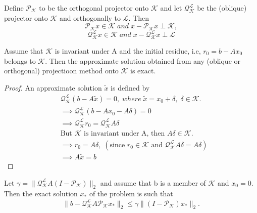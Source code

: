 \documentclass[10pt,a4paper]{article}
\begin{document}
Define $\mathcal{P}_{\mathcal{K}}$ to be the orthogonal projector onto $\mathcal{K}$ and let $\mathcal{Q}^\mathcal{L}_\mathcal{K}$ be the (oblique) projector onto $\mathcal{K}$ and orthogonally to $\mathcal{L}$. Then 
$$\mathcal{P}_{\mathcal{K}}x\in\mathcal{K}\;and\;x-\mathcal{P}_{\mathcal{K}}x\perp\mathcal{K},$$
$$\mathcal{Q}^\mathcal{L}_\mathcal{K}x\in\mathcal{K}\;and\;x-\mathcal{Q}^\mathcal{L}_\mathcal{K}x\perp\mathcal{L}$$

\begin{theorem}
Assume that $\mathcal{K}$ is invariant under A and the initial residue, i.e, $r_0=b-Ax_0$ belongs to $\mathcal{K}.$ Then the approximate solution obtained from any (oblique or orthogonal) projectioon method onto $\mathcal{K}$ is exact.
\end{theorem}

\begin{proof}
An approximate solution $\tilde{x}$ is defined by 
\begin{align*}
&\mathcal{Q}^\mathcal{L}_\mathcal{K}(b-A\tilde{x})=0,\;where\;\tilde{x}=x_0+\delta,\;\delta\in\mathcal{K}. \\
&\implies \mathcal{Q}^\mathcal{L}_\mathcal{K}(b-Ax_0-A\delta)=0 \\
&\implies \mathcal{Q}^\mathcal{L}_\mathcal{K}r_0=\mathcal{Q}^\mathcal{L}_\mathcal{K}A\delta \\
&\text{But }\mathcal{K}\text{ is invariant under A, then }A\delta\in\mathcal{K}. \\
&\implies r_0=A\delta,\;(\text{since }r_0\in\mathcal{K}\text{ and }\mathcal{Q}^\mathcal{L}_\mathcal{K}A\delta=A\delta) \\
&\implies A\tilde{x}=b
\end{align*}
\end{proof}

\begin{theorem}
Let $\gamma=\|\mathcal{Q}^\mathcal{L}_\mathcal{K}A(I-\mathcal{P}_\mathcal{K})\|_2$ and assume that b is a member of $\mathcal{K}$ and $x_0=0$. Then the exact solution $x_*$ of the problem is such that
$$\|b-\mathcal{Q}^\mathcal{L}_\mathcal{K}A\mathcal{P}_\mathcal{K}x_*\|_2\le\gamma\|(I-\mathcal{P}_\mathcal{K})x_*\|_2.$$
\end{theorem}
\end{document}
